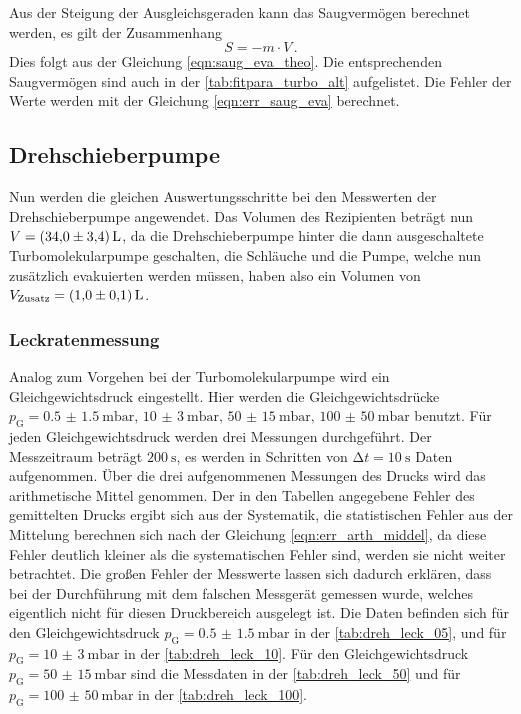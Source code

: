     \noindent Aus der Steigung der Ausgleichsgeraden kann das Saugvermögen berechnet werden, es gilt der Zusammenhang
    \begin{equation*}
      S = - m \cdot V\, .
    \end{equation*}
    Dies folgt aus der Gleichung \eqref{eqn:saug_eva_theo}. Die entsprechenden Saugvermögen sind auch in der \autoref{tab:fitpara_turbo_alt} aufgelistet. 
    Die Fehler der Werte werden mit der Gleichung \eqref{eqn:err_saug_eva} berechnet.

\subsection{Drehschieberpumpe}

    \noindent Nun werden die gleichen Auswertungsschritte bei den Messwerten der Drehschieberpumpe angewendet. Das Volumen des Rezipienten beträgt nun $V = \SI{34 \pm 3.4}{L}$, da die 
    Drehschieberpumpe hinter die dann ausgeschaltete Turbomolekularpumpe geschalten, die Schläuche und die Pumpe, welche nun zusätzlich evakuierten werden müssen, haben also ein Volumen von $V_\text{Zusatz} = \SI{1.0 \pm 0.1}{L}$. 

    \subsubsection{Leckratenmessung}

    \noindent Analog zum Vorgehen bei der Turbomolekularpumpe wird ein Gleichgewichtsdruck eingestellt. Hier werden die
    Gleichgewichtsdrücke $p_\text{G} = \SI{0.5(15)}{\milli\bar}, \, \SI{10(3)}{\milli\bar}, \, \SI{50(15)}{\milli\bar}, \, \SI{100(50)}{\milli\bar}$ benutzt. Für jeden Gleichgewichtsdruck werden 
    drei Messungen durchgeführt. Der Messzeitraum beträgt $\SI{200}{\second}$, es werden in Schritten von $\increment t = \SI{10}{\second}$ Daten aufgenommen. Über die drei aufgenommenen
    Messungen des Drucks wird das arithmetische Mittel genommen. Der in den Tabellen angegebene Fehler des gemittelten Drucks ergibt sich aus der Systematik, die statistischen Fehler aus der 
    Mittelung berechnen sich nach der Gleichung \eqref{eqn:err_arth_middel}, da diese Fehler deutlich kleiner als die systematischen Fehler sind, werden sie nicht weiter betrachtet.
    Die großen Fehler der Messwerte lassen sich dadurch erklären, dass bei der Durchführung mit dem falschen Messgerät gemessen wurde, welches eigentlich nicht für diesen Druckbereich ausgelegt ist. 
    Die Daten befinden sich für den Gleichgewichtsdruck $p_\text{G} = \SI{0.5(15)}{\milli\bar}$ in der \autoref{tab:dreh_leck_05}, und für $p_\text{G} = \SI{10(3)}{\milli\bar}$ in der 
    \autoref{tab:dreh_leck_10}. Für den Gleichgewichtsdruck $p_\text{G} = \SI{50(15)}{\milli\bar}$ sind die Messdaten in der \autoref{tab:dreh_leck_50} und für $p_\text{G} = \SI{100(50)}{\milli\bar}$
    in der \autoref{tab:dreh_leck_100}.

